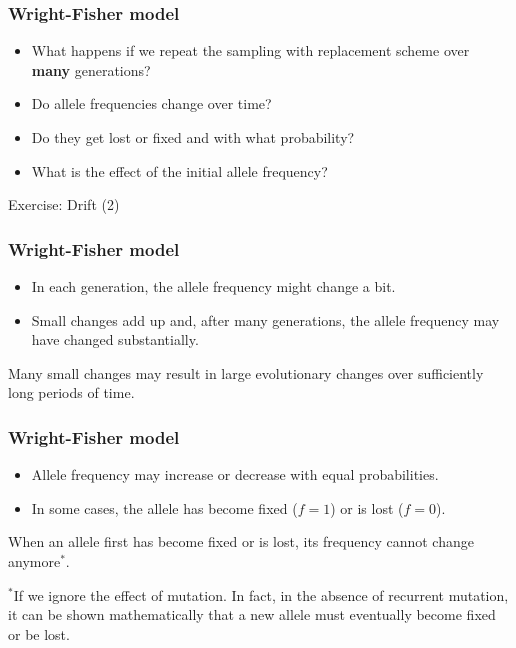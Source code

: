\documentclass{beamer}
\newcommand{\1}{\ensuremath{\mathbf{1}}}
\begin{document}
%
%
%
\begin{frame}\frametitle{Wright-Fisher model}
	\begin{itemize}
		\item What happens if we repeat the sampling with replacement scheme over \textbf{many} generations?
		\item Do allele frequencies change over time?
		\item Do they get lost or fixed and with what probability?
		\item What is the effect of the initial allele frequency?
	\end{itemize}
\end{frame}
%
%
%
\begin{frame}
	\begin{center}
		Exercise: Drift (2)
	\end{center}
\end{frame}
%
%
%
\begin{frame}\frametitle{Wright-Fisher model}
	\begin{itemize}
		\item In each generation, the allele frequency might change a bit.
		\item Small changes add up and, after many generations, the allele frequency may have changed substantially.
	\end{itemize}
	\begin{block}{}
		Many small changes may result in large evolutionary changes over sufficiently long periods of time.
	\end{block}
\end{frame}
%
%
%
\begin{frame}\frametitle{Wright-Fisher model}
	\begin{itemize}
		\item Allele frequency may increase or decrease with equal probabilities.
		\item In some cases, the allele has become fixed ($f = 1$) or is lost ($f = 0$).
	\end{itemize}
	\begin{block}{}
		When an allele first has become fixed or is lost, its frequency cannot change anymore$^{*}$.
	\end{block}
	{\scriptsize  $^{*}$If we ignore the effect of mutation. In fact, in the absence of recurrent mutation, it can be shown mathematically that a new allele must eventually become fixed or be lost.}
\end{frame}
\end{document}
